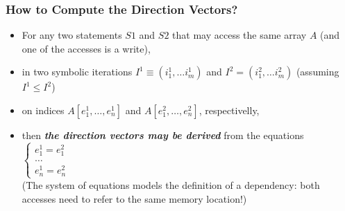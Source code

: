 \documentclass{beamer}
\begin{document}
\begin{frame}[fragile,t]
  \frametitle{How to Compute the Direction Vectors?}
\begin{itemize}
    \item For any two statements $S1$ and $S2$ that may access the same
            array $A$ (and one of the accesses is a write),\medskip
    \item in two symbolic iterations $I^1\equiv(i^1_1,\ldots i^1_m)$
            and $I^2=(i^2_1,\ldots i^2_m)$ (assuming $I^1 \leq I^2$)\medskip
    \item on indices $A[e^1_1,\ldots,e^1_n]$ and $A[e^2_1,\ldots,e^2_n]$,
            respectivelly,\medskip
    \item then \textbf{\it the direction vectors may be derived} from the equations\\
            $\begin{cases}
                e^1_1 = e^2_1\\
                \ldots\\
                e^1_n = e^2_n
            \end{cases}$\\\medskip
            (The system of equations models the definition of a dependency: 
                both accesses need to refer to the same memory location!)
\end{itemize}
\end{frame}
\end{document}

